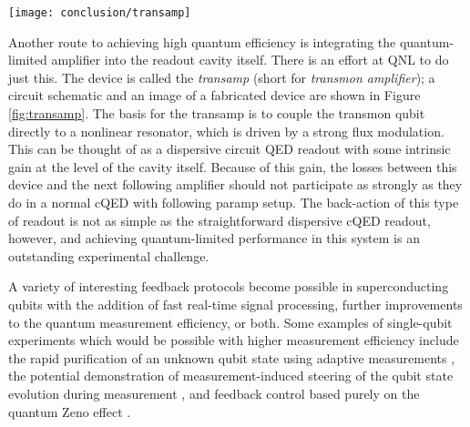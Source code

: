 \begin{figure*}
\begin{center}
\texttt{[image: conclusion/transamp]}
\end{center}
\caption[Circuit model and chip photo of transamp]{\textbf{a} Circuit model of transamp, showing differential launch using hybrid, single-junction transmon qubit in purple, nonlinear resonator (LJPA) in blue, and the bias line used to flux-pump the LJPA (red).  \textbf{b} False-color electron-microscope image of a transamp chip; the coloring corresponds to the circuit schematic in \textbf{a}.}
\label{fig:transamp}
\end{figure*}
Another route to achieving high quantum efficiency is integrating the quantum-limited amplifier into the readout cavity itself.  There is an effort at QNL to do just this.  The device is called the \textit{transamp} (short for \textit{transmon amplifier}); a circuit schematic and an image of a fabricated device are shown in Figure \ref{fig:transamp}.  The basis for the transamp is to couple the transmon qubit directly to a nonlinear resonator, which is driven by a strong flux modulation.  This can be thought of as a dispersive circuit QED readout with some intrinsic gain at the level of the cavity itself.  Because of this gain, the losses between this device and the next following amplifier should not participate as strongly as they do in a normal cQED with following paramp setup.  The back-action of this type of readout is not as simple as the straightforward dispersive cQED readout, however, and achieving quantum-limited performance in this system is an outstanding experimental challenge.

A variety of interesting feedback protocols become possible in superconducting qubits with the addition of fast real-time signal processing, further improvements to the quantum measurement efficiency, or both.  Some examples of single-qubit experiments which would be possible with higher measurement efficiency include the rapid purification of an unknown qubit state using adaptive measurements \cite{PhysRevA.67.030301}, the potential demonstration of measurement-induced steering of the qubit state evolution during measurement \cite{PhysRevLett.108.220402}, and feedback control based purely on the quantum Zeno effect \cite{1367-2630-12-4-043005}.

